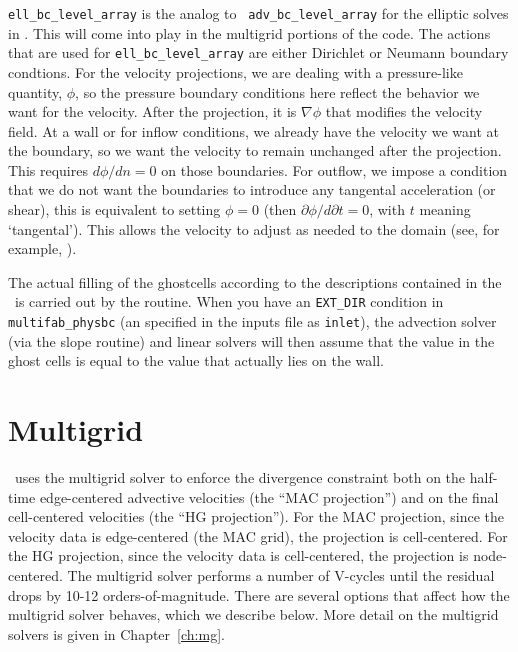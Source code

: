 {\tt ell\_bc\_level\_array} is the analog to {\tt
  adv\_bc\_level\_array} for the elliptic solves in \maestro.  This
will come into play in the multigrid portions of the code.  The
actions that are used for {\tt ell\_bc\_level\_array} are either
Dirichlet or Neumann boundary condtions.  For the velocity
projections, we are dealing with a pressure-like quantity, $\phi$, so
the pressure boundary conditions here reflect the behavior we want for
the velocity.  After the projection, it is $\nabla \phi$ that modifies
the velocity field.  At a wall or for inflow conditions, we already
have the velocity we want at the boundary, so we want the velocity to
remain unchanged after the projection.  This requires $d\phi/dn=0$ on
those boundaries.  For outflow, we impose a condition that we do not
want the boundaries to introduce any tangental acceleration (or
shear), this is equivalent to setting $\phi = 0$ (then $\partial
\phi/d\partial t = 0$, with $t$ meaning `tangental').  This allows the
velocity to adjust as needed to the domain (see, for example,
\cite{almgrenBellSzymczak:1996}).

The actual filling of the ghostcells according to the descriptions
contained in the \bctower\ is carried out by the  routine.  When you have an {\tt EXT\_DIR}
condition in {\tt multifab\_physbc} (an specified in the inputs file
as {\tt inlet}), the advection solver (via the slope routine) and
linear solvers will then assume that the value in the ghost cells is
equal to the value that actually lies on the wall.






\section{Multigrid}

\maestro\ uses the multigrid solver to enforce the divergence
constraint both on the half-time edge-centered advective velocities
(the ``MAC projection'') and on the final cell-centered velocities
(the ``HG projection'').  For the MAC projection, since the velocity
data is edge-centered (the MAC grid), the projection is cell-centered.
For the HG projection, since the velocity data is cell-centered, the
projection is node-centered.   The
multigrid solver performs a number of V-cycles until the residual
drops by 10-12 orders-of-magnitude.  There are several options that
affect how the multigrid solver behaves, which we describe below.
More detail on the multigrid solvers is given in Chapter~\ref{ch:mg}.


